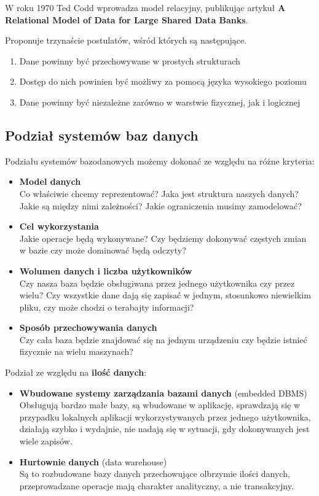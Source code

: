 W roku 1970 Ted Codd wprowadza model relacyjny, publikując artykuł \textbf{A Relational Model of Data for Large Shared Data Banks}.

Proponuje trzynaście postulatów, wśród których są następujące.

\begin{enumerate}
    \item Dane powinny być przechowywane w prostych strukturach
    \item Dostęp do nich powinien być możliwy za pomocą języka wysokiego poziomu
    \item Dane powinny być niezależne zarówno w warstwie fizycznej, jak i logicznej
\end{enumerate}

\subsection{Podział systemów baz danych}

Podziału systemów bazodanowych możemy dokonać ze względu na różne kryteria:
\begin{itemize}
    \item \textbf{Model danych} \\
    Co właściwie chcemy reprezentować?
    Jaka jest struktura naszych danych?
    Jakie są między nimi zależności?
    Jakie ograniczenia musimy zamodelować?
    \item \textbf{Cel wykorzystania} \\
    Jakie operacje będą wykonywane?
    Czy będziemy dokonywać częstych zmian w bazie czy może dominować będą odczyty?
    \item \textbf{Wolumen danych i liczba użytkowników} \\
    Czy nasza baza będzie obsługiwana przez jednego użytkownika czy przez wielu?
    Czy wszystkie dane dają się zapisać w jednym, stosunkowo niewielkim pliku, czy może chodzi o terabajty informacji?
    \item \textbf{Sposób przechowywania danych} \\
    Czy cała baza będzie znajdować się na jednym urządzeniu czy będzie istnieć fizycznie na wielu maszynach?
\end{itemize}

Podział ze względu na \textbf{ilość danych}:
\begin{itemize}
    \item \textbf{Wbudowane systemy zarządzania bazami danych} (embedded DBMS) \\
    Obsługują bardzo małe bazy, są wbudowane w aplikację, sprawdzają się w przypadku lokalnych aplikacji wykorzystywanych przez jednego użytkownika, działają szybko i wydajnie, nie nadają się w sytuacji, gdy dokonywanych jest wiele zapisów.
    \item \textbf{Hurtownie danych} (data warehouse) \\
    Są to rozbudowane bazy danych przechowujące olbrzymie ilości danych, przeprowadzane operacje mają charakter analityczny, a nie transakcyjny.
\end{itemize}

